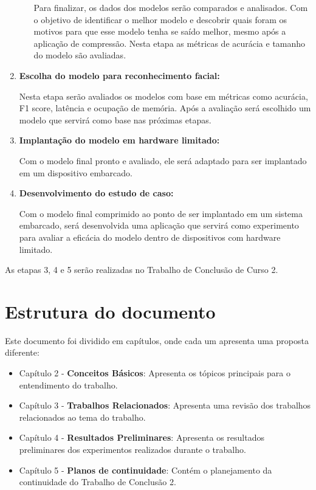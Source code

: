 \begin{enumerate}
\begin{enumerate}
			Para finalizar, os dados dos modelos serão comparados e analisados. Com o objetivo de
			identificar o melhor modelo e descobrir quais foram os motivos para que esse modelo tenha se
			saído melhor, mesmo após a aplicação de compressão. Nesta etapa as métricas de acurácia e
			tamanho do modelo são avaliadas.
	\end{enumerate}

	\item \textbf{Escolha do modelo para reconhecimento facial:}

		Nesta etapa serão avaliados os modelos com base em métricas como acurácia, F1 score, latência e ocupação de
		memória. Após a avaliação será escolhido um modelo que servirá como base nas próximas etapas.

	\item \textbf{Implantação do modelo em hardware limitado:}

		Com o modelo final pronto e avaliado, ele será adaptado para ser implantado em um dispositivo
		embarcado.


	\item \textbf{Desenvolvimento do estudo de caso:}

		Com o modelo final comprimido ao ponto de ser implantado em um sistema embarcado, será desenvolvida uma aplicação 	 	 que servirá como experimento para avaliar a eficácia do modelo dentro de dispositivos com hardware limitado.

\end{enumerate}

As etapas 3, 4 e 5 serão realizadas no Trabalho de Conclusão de Curso 2.

\section{Estrutura do documento}
Este documento foi dividido em capítulos, onde cada um apresenta uma proposta diferente:
\begin{itemize}
	\item Capítulo 2 - \textbf{Conceitos Básicos}: Apresenta os tópicos principais para o entendimento
		do trabalho.
	\item Capítulo 3 - \textbf{Trabalhos Relacionados}: Apresenta uma revisão dos trabalhos
		relacionados ao tema do trabalho.
	\item Capítulo 4 - \textbf{Resultados Preliminares}: Apresenta os resultados preliminares dos
		experimentos realizados durante o trabalho.
	\item Capítulo 5 - \textbf{Planos de continuidade}: Contém o planejamento da continuidade do
		Trabalho de Conclusão 2.
\end{itemize}
